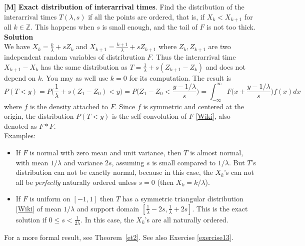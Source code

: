 \documentclass[10pt]{article}
\begin{document}
\begin{Exercise}\label{exercise8}
{\bf [M]}  {\bf Exact distribution of interarrival times}. Find the distribution of the \textcolor{index}{interarrival times} $T(\lambda,s)$ if all the points are ordered, that is, if $X_k<X_{k+1}$ for all $k\in\mathbb{Z}$. This
happens when $s$ is small enough, and the tail of $F$ is not too thick.\vspace{1ex} \\
{\bf Solution} \vspace{1ex}   \\
We have $X_k = \frac{k}{\lambda} + s Z_k$ and $X_{k+1} = \frac{k+1}{\lambda} + s Z_{k+1}$ where $Z_k,Z_{k+1}$ are two independent random variables of distribrution $F$. Thus the interarrival time $X_{k+1}-X_{k}$ has the same distribution as $T=\frac{1}{\lambda}+ s(Z_{k+1}-Z_k)$ and does not depend on $k$. You may as well use $k=0$ for its computation. The result is
$$P(T<y)=P\Big(\frac{1}{\lambda}+ s(Z_{1}-Z_0)<y\Big)=P\Big(Z_{1}-Z_0<\frac{y-1/\lambda}{s}\Big)=\int_{-\infty}^\infty F\Big(x+\frac{y-1/\lambda}{s}\Big)f(x)dx$$
where $f$ is the density attached to $F$.  Since $f$ is symmetric and centered at the origin, the distribution $P(T<y)$ is the \textcolor{index}{self-convolution} of $F$
[\href{https://en.wikipedia.org/wiki/Convolution_of_probability_distributions}{Wiki}], also denoted as $F * F$.   \vspace{1ex} \\
Examples:
\begin{itemize}
\item If $F$ is normal with zero mean and unit variance, then $T$ is almost normal, with mean $1/\lambda$ and variance $2s$, assuming $s$ is small compared to $1/\lambda$. But $T$'s distribution can not be exactly normal, because in this case, the $X_k$'s can not all be {\em perfectly} naturally ordered unless $s=0$ (then $X_k=k/\lambda$).
\item If $F$ is uniform on $[-1,1]$ then $T$ has a symmetric \textcolor{index}{triangular distribution} [\href{https://en.wikipedia.org/wiki/Triangular_distribution}{Wiki}] of mean $1/\lambda$ and support domain $[\frac{1}{\lambda}-2s, \frac{1}{\lambda}+2s]$. This is the exact solution if $0\leq s < \frac{1}{2\lambda}$. In this case, the $X_k$'s are all naturally ordered.
\end{itemize}
For a more formal result, see Theorem~\ref{et2}. See also Exercise \ref{exercise13}.
\end{Exercise}
\end{document}
